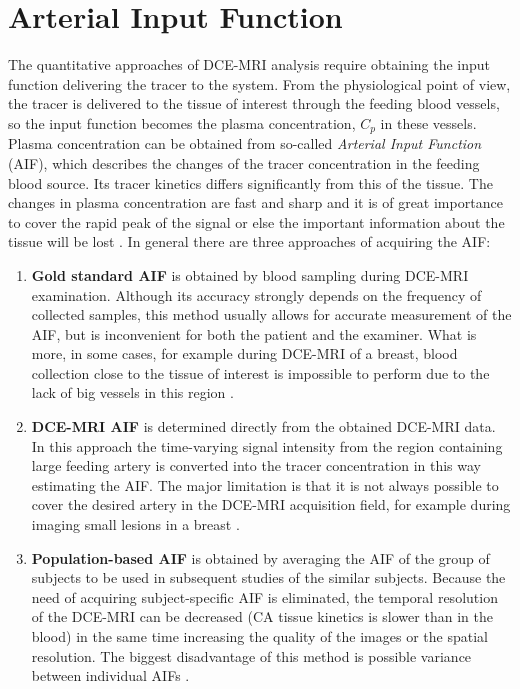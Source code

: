 \section{Arterial Input Function}
The quantitative approaches of DCE-MRI analysis require obtaining the input function delivering the tracer to the system. From the physiological point of view, the tracer is delivered to the tissue of interest through the feeding blood vessels, so the input function becomes the plasma concentration, $C_p$ in these vessels. Plasma concentration can be obtained from so-called \textit{Arterial Input Function} (AIF), which describes the changes of the tracer concentration in the feeding blood source. Its tracer kinetics differs significantly from this of the tissue. The changes in plasma concentration are fast and sharp and it is of great importance to cover the rapid peak of the signal or else the important information about the tissue will be lost \cite{khalifa2014models, jackson2005dynamic, barnes2012practical}.   
In general there are three approaches of acquiring the AIF:
\begin{enumerate}
\item{\textbf{Gold standard AIF}} is obtained by blood sampling during DCE-MRI examination.
Although its accuracy strongly depends on the frequency of collected samples, this method usually allows for accurate measurement of the AIF, but is inconvenient for both the patient and the examiner.
What is more, in some cases, for example during DCE-MRI of a breast, blood collection close to the tissue of interest is impossible to perform due to the lack of big vessels in this region \cite{khalifa2014models, barnes2012practical}. 
\item{\textbf{DCE-MRI AIF}} is determined directly from the obtained DCE-MRI data. In this approach the time-varying signal intensity from the region containing large feeding artery is converted into the tracer concentration in this way estimating the AIF. The major limitation is that it is not always possible to cover the desired artery in the DCE-MRI acquisition field, for example during imaging small lesions in a breast \cite{khalifa2014models}.   
\item{\textbf{Population-based AIF}} is obtained by averaging the AIF of the group of subjects to be used in subsequent studies of the similar subjects. Because the need of acquiring subject-specific AIF is eliminated, the temporal resolution of the DCE-MRI can be decreased (CA tissue kinetics is slower than in the blood) in the same time increasing the quality of the images or the spatial resolution. The biggest disadvantage of this method is possible variance between individual AIFs \cite{jackson2005dynamic}. 
\end{enumerate}



